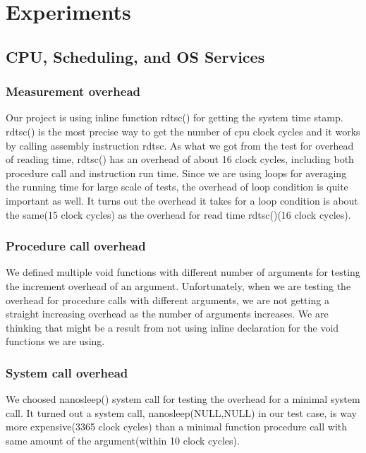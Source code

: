 \section{Experiments}



\subsection{CPU, Scheduling, and OS Services}

\subsubsection{Measurement overhead}
Our project is using inline function rdtsc() for getting the system time stamp. rdtsc() is the most precise way to get the number of cpu clock cycles and it works by calling assembly instruction rdtsc. As what we got from the test for overhead of reading time, rdtsc() has an overhead of about 16 clock cycles, including both procedure call and instruction run time.
Since we are using loops for averaging the running time for large scale of tests, the overhead of loop condition is quite important as well. It turns out the overhead it takes for a loop condition is about the same(15 clock cycles) as the overhead for read time rdtsc()(16 clock cycles).

\subsubsection{Procedure call overhead}
We defined multiple void functions with different number of arguments for testing the increment overhead of an argument. Unfortunately, when we are testing the overhead for procedure calls with different arguments, we are not getting a straight increasing overhead as the number of arguments increases. We are thinking that might be a result from not using inline declaration for the void functions we are using.

\subsubsection{System call overhead}
We choosed nanosleep() system call for testing the overhead for a minimal system call. It turned out a system call, nanosleep(NULL,NULL) in our test case, is way more expensive(3365 clock cycles) than a minimal function procedure call with same amount of the argument(within 10 clock cycles).

